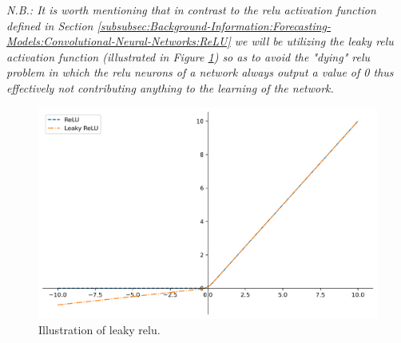 \begin{adjustwidth}{-1.65cm}{-0.0cm}
\begin{enumerate}[label=Step 4.2.\arabic*:, leftmargin=*]
    \noindent \newline \textit{N.B.: It is worth mentioning that in contrast to the \gls{relu} activation function defined in Section \ref{subsubsec:Background-Information:Forecasting-Models:Convolutional-Neural-Networks:ReLU} we will be utilizing the leaky \gls{relu} activation function (illustrated in Figure \ref{fig:Leaky-ReLU}) so as to avoid the "dying" \gls{relu} problem in which the \gls{relu} neurons of a network always output a value of 0 thus effectively not contributing anything to the learning of the network.}
    
    \begin{figure}[H]
        \centering
        \includegraphics[width=\textwidth]{Images/Chapter 6/Stage 4/Other/Leaky-ReLU.pdf}
        \caption{Illustration of leaky \gls{relu}.}
        \label{fig:Leaky-ReLU}
    \end{figure}

    \end{enumerate}
\end{adjustwidth}